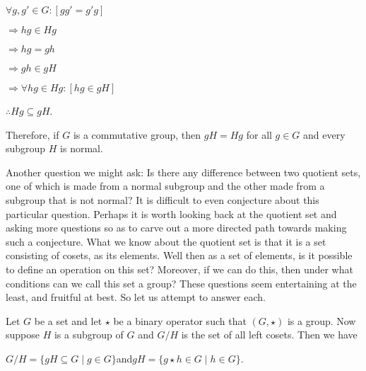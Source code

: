 \documentclass[12pt, a4paper]{article}
\begin{document}
\hspace{2mm} $\forall g,g'\in G\colon[gg'=g'g]$\par
\vspace{2mm}
\hspace{10mm} $\Rightarrow hg\in Hg$\par
\vspace{2mm}
\hspace{10mm} $\Rightarrow hg=gh$\par
\vspace{2mm}
\hspace{10mm} $\Rightarrow gh\in gH$\par
\vspace{2mm}
\hspace{10mm} $\Rightarrow\forall hg\in Hg\colon [hg\in gH]$\par
\vspace{2mm}
\hspace{2mm} $\therefore Hg\subseteq gH$.\par

\vspace{4mm}

    Therefore, if $G$ is a commutative group, then $gH=Hg$ for all $g\in G$ and every subgroup $H$ is normal.\par
    
    Another question we might ask: Is there any difference between two quotient sets, one of which is made from a normal subgroup and the other made from a subgroup that is not normal? It is difficult to even conjecture about this particular question. Perhaps it is worth looking back at the quotient set and asking more questions so as to carve out a more directed path towards making such a conjecture. What we know about the quotient set is that it is a set consisting of cosets, as its elements. Well then as a set of elements, is it possible to define an operation on this set? Moreover, if we can do this, then under what conditions can we call this set a group? These questions seem entertaining at the least, and fruitful at best. So let us attempt to answer each.
    
\newpage

    Let $G$ be a set and let $\star$ be a binary operator such that $(G,\star)$ is a group. Now suppose $H$ is a subgroup of $G$ and $G/H$ is the set of all left cosets. Then we have\par
    
\vspace{4mm}

        \centerline{$G/H=\{gH\subseteq G\mid g\in G\}$\hspace{5mm}and\hspace{5mm}$gH=\{g\star h\in G\mid h\in G\}$.}
        
\end{document}
